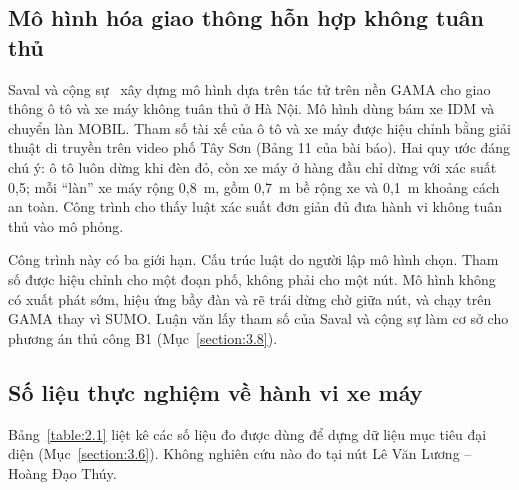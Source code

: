 \documentclass[../DoAn.tex]{subfiles}
\begin{document}
\subsection{Mô hình hóa giao thông hỗn hợp không tuân thủ}
\label{subsection:2.1.2}

Saval và cộng sự~\cite{saval2023mixed} xây dựng mô hình dựa trên tác tử trên nền GAMA cho giao thông ô tô và xe máy không tuân thủ ở Hà Nội. Mô hình dùng bám xe IDM và chuyển làn MOBIL. Tham số tài xế của ô tô và xe máy được hiệu chỉnh bằng giải thuật di truyền trên video phố Tây Sơn (Bảng 11 của bài báo). Hai quy ước đáng chú ý: ô tô luôn dừng khi đèn đỏ, còn xe máy ở hàng đầu chỉ dừng với xác suất 0,5; mỗi ``làn'' xe máy rộng 0,8~m, gồm 0,7~m bề rộng xe và 0,1~m khoảng cách an toàn. Công trình cho thấy luật xác suất đơn giản đủ đưa hành vi không tuân thủ vào mô phỏng.

Công trình này có ba giới hạn. Cấu trúc luật do người lập mô hình chọn. Tham số được hiệu chỉnh cho một đoạn phố, không phải cho một nút. Mô hình không có xuất phát sớm, hiệu ứng bầy đàn và rẽ trái dừng chờ giữa nút, và chạy trên GAMA thay vì SUMO. Luận văn lấy tham số của Saval và cộng sự làm cơ sở cho phương án thủ công B1 (Mục~\ref{section:3.8}).

\subsection{Số liệu thực nghiệm về hành vi xe máy}
\label{subsection:2.1.3}

Bảng~\ref{table:2.1} liệt kê các số liệu đo được dùng để dựng dữ liệu mục tiêu đại diện (Mục~\ref{section:3.6}). Không nghiên cứu nào đo tại nút Lê Văn Lương -- Hoàng Đạo Thúy.
\end{document}
